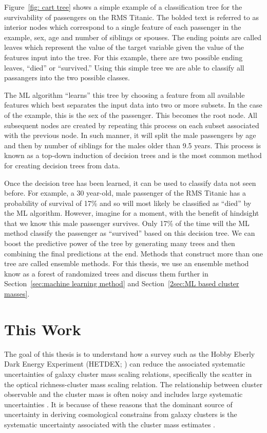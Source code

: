 Figure~\ref{fig: cart tree} shows a simple example of a classification tree for the survivability of passengers on the RMS Titanic. The bolded text is referred to as interior nodes which correspond to a single feature of each passenger in the example, sex, age and number of siblings or spouses. The ending points are called leaves which represent the value of the target variable given the value of the features input into the tree. For this example, there are two possible ending leaves, ``died'' or ``survived.'' Using this simple tree we are able to classify all passangers into the two possible classes. 

The ML algorithm ``learns'' this tree by choosing a feature from all available features which best separates the input data into two or more subsets. In the case of the example, this is the sex of the passenger. This becomes the root node. All subsequent nodes are created by repeating this process on each subset associated with the previous node. In such manner, it will split the male passengers by age and then by number of siblings for the males older than 9.5 years. This process is known as a top-down induction of decision trees and is the most common method for creating decision trees from data.

Once the decision tree has been learned, it can be used to classify data not seen before. For example, a 30 year-old, male passenger of the RMS Titanic has a probability of survival of 17\% and so will most likely be classified as ``died'' by the ML algorithm. However, imagine for a moment, with the benefit of hindsight that we know this male passenger survives. Only 17\% of the time will the ML method classify the passenger as ``survived'' based on this decision tree. We can boost the predictive power of the tree by generating many trees and then combining the final predictions at the end. Methods that construct more than one tree are called ensemble methods. For this thesis, we use an ensemble method know as a forest of randomized trees and discuss them further in Section~\ref{sec:machine learning method} and Section~\ref{2sec:ML based cluster masses}.

\section{This Work}
The goal of this thesis is to understand how a survey such as the Hobby Eberly Dark Energy Experiment (HETDEX; \citealt{Hill2008}) can reduce the associated systematic uncertainties of galaxy cluster mass scaling relations, specifically the scatter in the optical richness-cluster mass scaling relation. The relationship between cluster observable and the cluster mass is often noisy and includes large systematic uncertainties . It is because of these reasons that the dominant source of uncertainty in deriving cosmological constrains from galaxy clusters is the systematic uncertainty associated with the cluster mass estimates .

